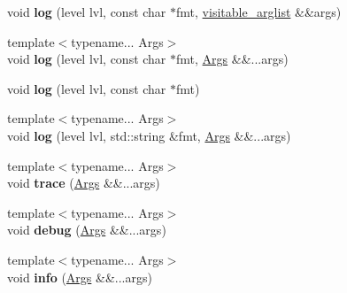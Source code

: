\begin{DoxyCompactItemize}
\item 
void {\bfseries log} (level lvl, const char $\ast$fmt, \hyperlink{classgxx_1_1visitable__arglist}{visitable\+\_\+arglist} \&\&args)\hypertarget{classgxx_1_1log_1_1logger_aab161ee185ce599ac1aa4e5c016ce62e}{}\label{classgxx_1_1log_1_1logger_aab161ee185ce599ac1aa4e5c016ce62e}

\item 
{\footnotesize template$<$typename... Args$>$ }\\void {\bfseries log} (level lvl, const char $\ast$fmt, \hyperlink{structArgs}{Args} \&\&...args)\hypertarget{classgxx_1_1log_1_1logger_ad2fb8975812306f8645d4695093627e8}{}\label{classgxx_1_1log_1_1logger_ad2fb8975812306f8645d4695093627e8}

\item 
void {\bfseries log} (level lvl, const char $\ast$fmt)\hypertarget{classgxx_1_1log_1_1logger_afbf52f2aa23291ef47f859fe4234af2d}{}\label{classgxx_1_1log_1_1logger_afbf52f2aa23291ef47f859fe4234af2d}

\item 
{\footnotesize template$<$typename... Args$>$ }\\void {\bfseries log} (level lvl, std\+::string \&fmt, \hyperlink{structArgs}{Args} \&\&...args)\hypertarget{classgxx_1_1log_1_1logger_a0271e182b5945500a1dfebca89d00054}{}\label{classgxx_1_1log_1_1logger_a0271e182b5945500a1dfebca89d00054}

\item 
{\footnotesize template$<$typename... Args$>$ }\\void {\bfseries trace} (\hyperlink{structArgs}{Args} \&\&...args)\hypertarget{classgxx_1_1log_1_1logger_aeebee9c69f9707c222800aed638d642a}{}\label{classgxx_1_1log_1_1logger_aeebee9c69f9707c222800aed638d642a}

\item 
{\footnotesize template$<$typename... Args$>$ }\\void {\bfseries debug} (\hyperlink{structArgs}{Args} \&\&...args)\hypertarget{classgxx_1_1log_1_1logger_a58eac8ab985601769e3be5947860967e}{}\label{classgxx_1_1log_1_1logger_a58eac8ab985601769e3be5947860967e}

\item 
{\footnotesize template$<$typename... Args$>$ }\\void {\bfseries info} (\hyperlink{structArgs}{Args} \&\&...args)\hypertarget{classgxx_1_1log_1_1logger_a2f8eb29dcd6db8033d5f92aa47c09ea9}{}\label{classgxx_1_1log_1_1logger_a2f8eb29dcd6db8033d5f92aa47c09ea9}


\end{DoxyCompactItemize}
